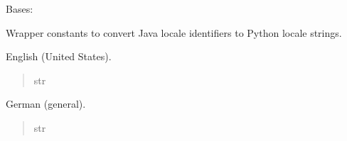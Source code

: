 \documentclass[letterpaper,10pt,english]{sphinxmanual}
\begin{document}
\begin{fulllineitems}
\label{\detokenize{apache_commons_validator_python.util:apache_commons_validator_python.util.datetime_helpers.JavaToPyLocale}}
\pysigstartsignatures
{}
\pysigstopsignatures
\sphinxAtStartPar
Bases: 

\sphinxAtStartPar
Wrapper constants to convert Java locale identifiers to Python locale strings.

\begin{fulllineitems}
\label{\detokenize{apache_commons_validator_python.util:apache_commons_validator_python.util.datetime_helpers.JavaToPyLocale.US}}
\pysigstartsignatures
{}
\pysigstopsignatures
\sphinxAtStartPar
English (United States).
\begin{quote}\begin{description}
\sphinxAtStartPar
str

\end{description}\end{quote}

\end{fulllineitems}


\begin{fulllineitems}
\label{\detokenize{apache_commons_validator_python.util:apache_commons_validator_python.util.datetime_helpers.JavaToPyLocale.GERMAN}}
\pysigstartsignatures
{}
\pysigstopsignatures
\sphinxAtStartPar
German (general).
\begin{quote}\begin{description}
\sphinxAtStartPar
str

\end{description}\end{quote}


\end{fulllineitems}
\end{fulllineitems}
\end{document}
